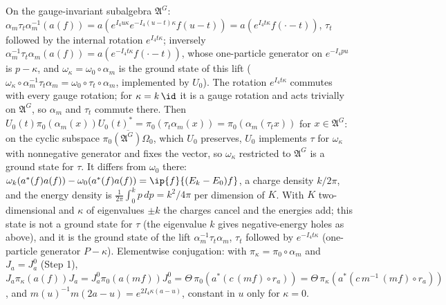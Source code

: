 On the gauge-invariant subalgebra $\mathfrak{A}^{G}$: $\alpha_{m}\tau_{t}\alpha_{m}^{-1}(a(f)) = a(e^{I_{4}u\kappa}e^{-I_{4}(u - t)\kappa}f(u - t)) = a(e^{I_{4}t\kappa}f(\cdot - t))$, $\tau_{t}$ followed by the internal rotation $e^{I_{4}t\kappa}$; inversely $\alpha_{m}^{-1}\tau_{t}\alpha_{m}(a(f)) = a(e^{-I_{4}t\kappa}f(\cdot - t))$, whose one-particle generator on $e^{-I_{4}pu}$ is $p - \kappa$, and $\omega_{\kappa} = \omega_{0}\circ\alpha_{m}$ is the ground state of this lift ($\omega_{\kappa}\circ\alpha_{m}^{-1}\tau_{t}\alpha_{m} = \omega_{0}\circ\tau_{t}\circ\alpha_{m}$, implemented by $U_{0}$). The rotation $e^{I_{4}t\kappa}$ commutes with every gauge rotation; for $\kappa = k\,\id$ it is a gauge rotation and acts trivially on $\mathfrak{A}^{G}$, so $\alpha_{m}$ and $\tau_{t}$ commute there. Then $U_{0}(t)\pi_{0}(\alpha_{m}(x))U_{0}(t)^{*} = \pi_{0}(\tau_{t}\alpha_{m}(x)) = \pi_{0}(\alpha_{m}(\tau_{t}x))$ for $x \in \mathfrak{A}^{G}$: on the cyclic subspace $\overline{\pi_{0}(\mathfrak{A}^{G})\Omega_{0}}$, which $U_{0}$ preserves, $U_{0}$ implements $\tau$ for $\omega_{\kappa}$ with nonnegative generator and fixes the vector, so $\omega_{\kappa}$ restricted to $\mathfrak{A}^{G}$ is a ground state for $\tau$. It differs from $\omega_{0}$ there: $\omega_{k}(a^{*}(f)a(f)) - \omega_{0}(a^{*}(f)a(f)) = \ip{f}{(E_{k} - E_{0})f}$, a charge density $k/2\pi$, and the energy density is $\frac{1}{2\pi}\int_{0}^{k}p\,dp = k^{2}/4\pi$ per dimension of $K$. With $K$ two-dimensional and $\kappa$ of eigenvalues $\pm k$ the charges cancel and the energies add; this state is not a ground state for $\tau$ (the eigenvalue $k$ gives negative-energy holes as above), and it is the ground state of the lift $\alpha_{m}^{-1}\tau_{t}\alpha_{m}$, $\tau_{t}$ followed by $e^{-I_{4}t\kappa}$ (one-particle generator $P - \kappa$).
Elementwise conjugation: with $\pi_{\kappa} = \pi_{0}\circ\alpha_{m}$ and $J_{a} = J^{0}_{a}$ (Step 1), $J_{a}\pi_{\kappa}(a(f))J_{a} = J^{0}_{a}\pi_{0}(a(mf))J^{0}_{a} = \Theta\,\pi_{0}(a^{*}(c\,(mf)\circ r_{a})) = \Theta\,\pi_{\kappa}(a^{*}(c\,m^{-1}\,(mf)\circ r_{a}))$, and $m(u)^{-1}m(2a - u) = e^{2I_{4}\kappa(a - u)}$, constant in $u$ only for $\kappa = 0$.

